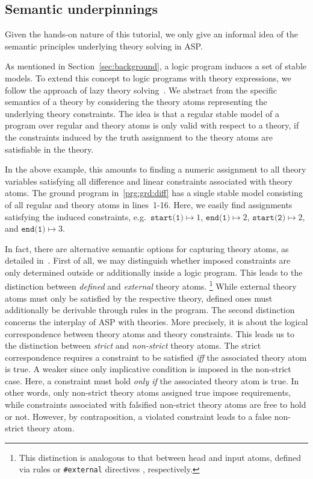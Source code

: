 
\subsection{Semantic underpinnings}
\label{sec:semantics}

Given the hands-on nature of this tutorial,
we only give an informal idea of the semantic principles underlying theory solving in ASP.

As mentioned in Section~\ref{sec:background}, a logic program induces a set of stable models.
%
To extend this concept to logic programs with theory expressions,
we follow the approach of lazy theory solving~\cite{baseseti09a}.
We abstract from the specific semantics of a theory by considering the theory atoms representing the underlying theory constraints.
The idea is that a regular stable model of a program over regular and theory atoms is only valid with respect to a theory,
if the constraints induced by the truth assignment to the theory atoms are satisfiable in the theory.

In the above example, 
this amounts to finding a numeric assignment to all theory variables satisfying all difference and linear constraints associated with theory atoms.
%
The ground program in~\ref{prg:grd:diff} has a single stable model consisting of all regular and theory atoms in lines~1-16.
%
Here, we easily find assignments satisfying the induced constraints,
e.g.\
\(
\texttt{start(1)}\mapsto 1
\),
\(
\texttt{end(1)}\mapsto 2
\),
\(
\texttt{start(2)}\mapsto 2
\), and
\(
\texttt{end(1)}\mapsto 3
\).

In fact,
there are alternative semantic options for capturing theory atoms, as detailed in~\cite{gekakaosscwa16a}.
%
First of all,
we may distinguish whether imposed constraints are only determined outside or additionally inside a logic program.
%
This leads to the distinction between \emph{defined} and \emph{external} theory atoms.%
\footnote{This distinction is analogous to that between head and input atoms,
  defined via rules or \lstinline{#external} directives \cite{gekakasc14b}, respectively.}
%
While external theory atoms must only be satisfied by the respective theory,
defined ones must additionally be derivable through rules in the program.
%
The second distinction concerns the interplay of ASP with theories.
More precisely, it is about the logical correspondence between theory atoms and theory constraints.
%
This leads us to the distinction between \emph{strict} and \emph{non-strict} theory atoms.
%
The strict correspondence requires
a constraint to be satisfied 
\textit{iff}
the associated theory atom is true.
%
A weaker since only implicative condition is imposed in the non-strict case.
Here, a constraint must hold 
\textit{only if}
the associated theory atom is true.
%
In other words, only non-strict theory atoms assigned true impose requirements, 
while constraints associated with falsified non-strict theory atoms are free to hold or not.
%
However, by contraposition, a violated constraint leads to a false non-strict theory atom.

